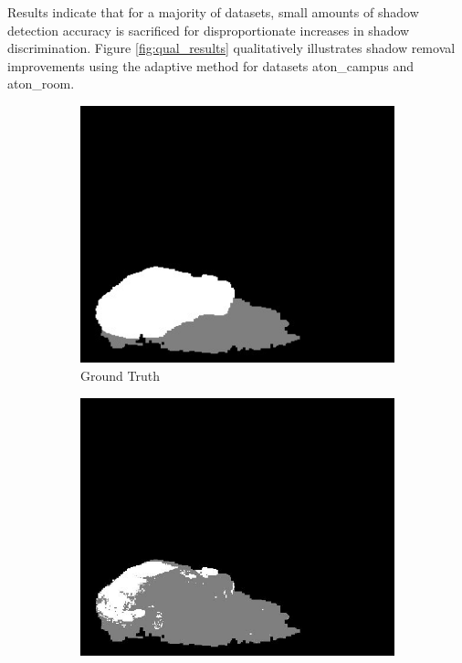 Results indicate that for a majority of datasets, small amounts of shadow detection accuracy is sacrificed for disproportionate increases in shadow discrimination. Figure \ref{fig:qual_results} qualitatively illustrates shadow removal improvements using the adaptive method for datasets aton\_campus and aton\_room.

\begin{figure}
  \centering
  \begin{subfigure}{.32\linewidth}
  \includegraphics[width=1\linewidth]{figures/model/campus_0061_gt.jpg}
  \caption{Ground Truth}
  \end{subfigure}
  \hfill
  \begin{subfigure}{.32\linewidth}
  \includegraphics[width=1\linewidth]{figures/model/campus_0061_default.jpg}

\end{subfigure}
\end{figure}
